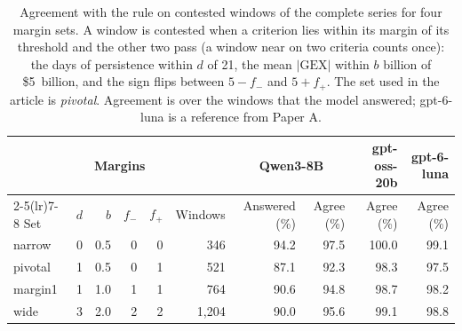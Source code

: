\begin{table}[H]
\centering
\caption{Agreement with the rule on contested windows of the complete series for four margin sets. A window is contested when a criterion lies within its margin of its threshold and the other two pass (a window near on two criteria counts once): the days of persistence within $d$ of 21, the mean $|\mathrm{GEX}|$ within $b$ billion of \$5~billion, and the sign flips between $5-f_{-}$ and $5+f_{+}$. The set used in the article is \emph{pivotal}. Agreement is over the windows that the model answered; gpt-6-luna is a reference from Paper A.}
\label{tab:s:contested}
\scriptsize
\setlength{\tabcolsep}{3pt}
\begin{tabular}{@{}lrrrrrrrrr@{}}
\toprule
& \multicolumn{4}{c}{Margins} & & \multicolumn{2}{c}{Qwen3-8B} & gpt-oss-20b & gpt-6-luna \\
\cmidrule(lr){2-5}\cmidrule(lr){7-8}
Set & $d$ & $b$ & $f_{-}$ & $f_{+}$ & Windows & Answered (\%) & Agree (\%) & Agree (\%) & Agree (\%) \\
\midrule
narrow & 0 & 0.5 & 0 & 0 & 346 & 94.2 & 97.5 & 100.0 & 99.1 \\
pivotal & 1 & 0.5 & 0 & 1 & 521 & 87.1 & 92.3 & 98.3 & 97.5 \\
margin1 & 1 & 1.0 & 1 & 1 & 764 & 90.6 & 94.8 & 98.7 & 98.2 \\
wide & 3 & 2.0 & 2 & 2 & 1{,}204 & 90.0 & 95.6 & 99.1 & 98.8 \\
\bottomrule
\end{tabular}
\end{table}
